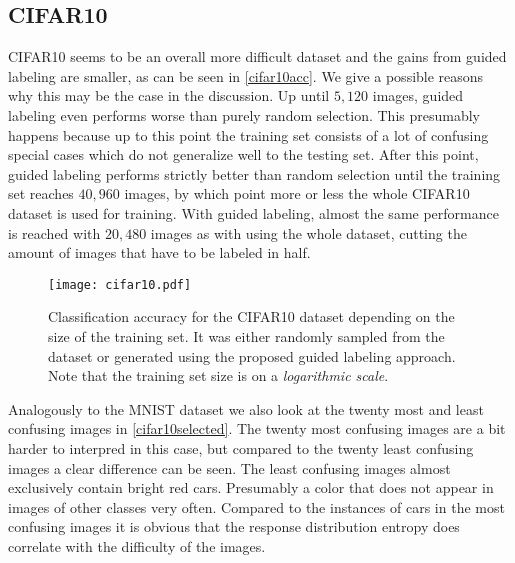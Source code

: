 \documentclass[10pt,twocolumn,letterpaper]{article}
\begin{document}
\subsection{CIFAR10}
\label{sec-4-2}
CIFAR10 seems to be an overall more difficult dataset and the gains
from guided labeling are smaller, as can be seen in
\autoref{cifar10acc}. We give a possible reasons why this may be the
case in the discussion. Up until $5,120$ images, guided labeling even
performs worse than purely random selection. This presumably happens
because up to this point the training set consists of a lot of
confusing special cases which do not generalize well to the testing
set. After this point, guided labeling performs strictly better than
random selection until the training set reaches $40,960$ images, by
which point more or less the whole CIFAR10 dataset is used for
training. With guided labeling, almost the same performance is reached
with $20,480$ images as with using the whole dataset, cutting the
amount of images that have to be labeled in half.
\begin{figure}
  \centering
  \texttt{[image: cifar10.pdf]}
  \caption{Classification accuracy for the CIFAR10 dataset depending on
    the size of the training set. It was either randomly sampled from
    the dataset or generated using the proposed guided labeling
    approach. Note that the training set size is on a
    \textit{logarithmic scale}.\label{cifar10acc}}
\end{figure}
Analogously to the MNIST dataset we also look at the twenty most and
least confusing images in \autoref{cifar10selected}. The twenty most
confusing images are a bit harder to interpred in this case, but
compared to the twenty least confusing images a clear difference can
be seen. The least confusing images almost exclusively contain bright
red cars. Presumably a color that does not appear in images of other
classes very often. Compared to the instances of cars in the most
confusing images it is obvious that the response distribution entropy
does correlate with the difficulty of the images.
\end{document}
